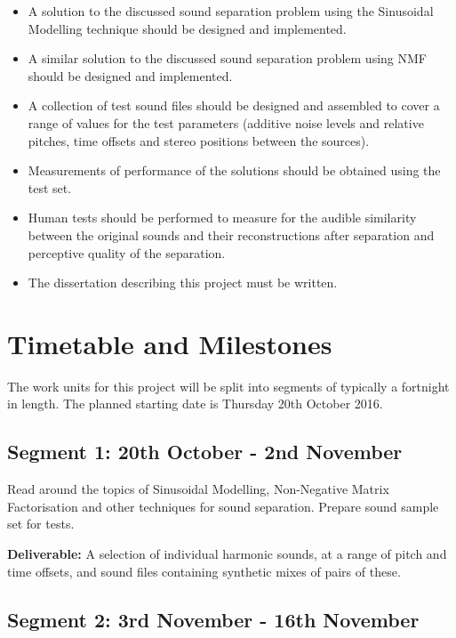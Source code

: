 \documentclass[12pt,a4paper,twoside,openright]{report}
\begin{document}
\begin{itemize}
\item A solution to the discussed sound separation problem using the Sinusoidal Modelling technique should be designed and implemented.

\item A similar solution to the discussed sound separation problem using NMF should be designed and implemented.

\item A collection of test sound files should be designed and assembled to cover a range of values for the test parameters (additive noise levels and relative pitches, time offsets and stereo positions between the sources).

\item Measurements of performance of the solutions should be obtained using the test set.

\item Human tests should be performed to measure for the audible similarity between the original sounds and their reconstructions after separation and perceptive quality of the separation.

\item The dissertation describing this project must be written.
\end{itemize}

\section*{Timetable and Milestones}

The work units for this project will be split into segments of typically a fortnight in length. The planned starting date is Thursday 20th October 2016.

\subsection*{Segment 1: 20th October - 2nd November}

Read around the topics of Sinusoidal Modelling, Non-Negative Matrix Factorisation and other techniques for sound separation. Prepare sound sample set for tests.

\textbf{Deliverable:} A selection of individual harmonic sounds, at a range of pitch and time offsets, and sound files containing synthetic mixes of pairs of these.

\subsection*{Segment 2: 3rd November - 16th November}
\end{document}
